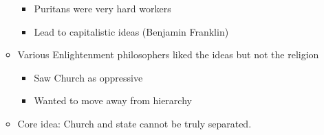 \documentclass[8pt]{article}
\begin{document}
\begin{enumerate}
\begin{itemize}
\begin{itemize}
            \item Puritans were very hard workers
            \item Lead to capitalistic ideas (Benjamin Franklin)
        \end{itemize}
        \item Various Enlightenment philosophers liked the ideas but not the religion
        \begin{itemize}
            \item Saw Church as oppressive
            \item Wanted to move away from hierarchy
        \end{itemize}
        \item Core idea: Church and state cannot be truly separated.
    \end{itemize}


\end{enumerate}
\end{document}
